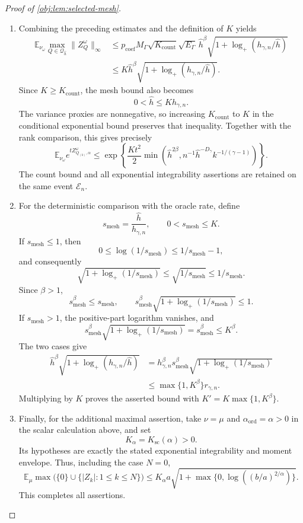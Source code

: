 \documentclass[11pt]{article}
\begin{document}
\begin{proof}[Proof of \cref{obj:lem:selected-mesh}]
\begin{enumerate}
\item Combining the preceding estimates and the definition of \(K\)
yields
\[
\begin{aligned}
\mathbb E_{\nu_\omega}
\max_{Q\in\mathcal Q_{\widehat h}}\|Z_Q^\omega\|_\infty
&\le
p_{\mathrm{coef}}M_\Gamma
\sqrt{K_{\mathrm{count}}}\sqrt{E_\Gamma}\,
\widehat h^\beta
\sqrt{1+\log_+(h_{\gamma,n}/\widehat h)}\\
&\le
K\widehat h^\beta
\sqrt{1+\log_+(h_{\gamma,n}/\widehat h)}.
\end{aligned}
\]
Since \(K\ge K_{\mathrm{count}}\), the mesh bound also becomes
\[
0<\widehat h\le Kh_{\gamma,n}.
\]
The variance proxies are nonnegative, so increasing
\(K_{\mathrm{count}}\) to \(K\) in the conditional exponential bound
preserves that inequality. Together with the rank comparison, this
gives precisely
\[
\mathbb E_{\nu_\omega}e^{tZ_{Q_{(k)},\alpha}^\omega}
\le
\exp\!\left\{
\frac{Kt^2}{2}
\min\!\left(
\widehat h^{2\beta},
n^{-1}\widehat h^{-D_\gamma}k^{-1/(\gamma-1)}
\right)
\right\}.
\]
The count bound and all exponential integrability assertions are
retained on the same event \(\mathcal E_n\).

\item For the deterministic comparison with the oracle rate, define
\[
s_{\mathrm{mesh}}=\frac{\widehat h}{h_{\gamma,n}},
\qquad
0<s_{\mathrm{mesh}}\le K.
\]
If \(s_{\mathrm{mesh}}\le1\), then
\[
0\le\log(1/s_{\mathrm{mesh}})
\le1/s_{\mathrm{mesh}}-1,
\]
and consequently
\[
\sqrt{1+\log_+(1/s_{\mathrm{mesh}})}
\le\sqrt{1/s_{\mathrm{mesh}}}
\le1/s_{\mathrm{mesh}}.
\]
Since \(\beta>1\),
\[
s_{\mathrm{mesh}}^\beta\le s_{\mathrm{mesh}},
\qquad
s_{\mathrm{mesh}}^\beta
\sqrt{1+\log_+(1/s_{\mathrm{mesh}})}
\le1.
\]
If \(s_{\mathrm{mesh}}>1\), the positive-part logarithm vanishes, and
\[
s_{\mathrm{mesh}}^\beta
\sqrt{1+\log_+(1/s_{\mathrm{mesh}})}
=s_{\mathrm{mesh}}^\beta\le K^\beta.
\]
The two cases give
\[
\begin{aligned}
\widehat h^\beta
\sqrt{1+\log_+(h_{\gamma,n}/\widehat h)}
&=
h_{\gamma,n}^\beta s_{\mathrm{mesh}}^\beta
\sqrt{1+\log_+(1/s_{\mathrm{mesh}})}\\
&\le\max\{1,K^\beta\}r_{\gamma,n}.
\end{aligned}
\]
Multiplying by \(K\) proves the asserted bound with
\(K'=K\max\{1,K^\beta\}\).

\item Finally, for the additional maximal assertion, take
\(\nu=\mu\) and \(\alpha_{\mathrm{ord}}=\alpha>0\) in the scalar
calculation above, and set
\[
K_\alpha=K_{\mathrm{sc}}(\alpha)>0.
\]
Its hypotheses are exactly the stated exponential integrability and
moment envelope. Thus, including the case \(N=0\),
\[
\mathbb E_\mu
\max\bigl(\{0\}\cup\{|Z_k|:1\le k\le N\}\bigr)
\le
K_\alpha a
\sqrt{1+\max\{0,\log((b/a)^{2/\alpha})\}}.
\]
This completes all assertions.
\end{enumerate}
\end{proof}
\end{document}
